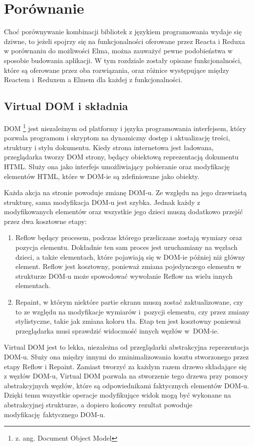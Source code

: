 \chapter{Porównanie} \label{chap:porownanie}
Choć porównywanie kombinacji bibliotek z językiem programowania wydaje się dziwne, to jeżeli spojrzy się na funkcjonalności oferowane przez Reacta i Reduxa w porównaniu do możliwości Elma, można zauważyć pewne podobieństwa w sposobie budowania aplikacji. W tym rozdziale zostały opisane funkcjonalności, które są oferowane przez oba rozwiązania, oraz różnice występujące między Reactem i~Reduxem a Elmem dla każdej z funkcjonalności.

\section{Virtual DOM i składnia}
DOM \footnote{z. ang. Document Object Model} jest niezależnym od platformy i języka programowania interfejsem, który pozwala programom i skryptom na dynamiczny dostęp i aktualizację treści, struktury i stylu dokumentu. Kiedy strona internetowa jest ładowana, przeglądarka tworzy DOM strony, będący obiektową reprezentacją dokumentu HTML. Służy ona jako interfejs umożliwiający pobieranie oraz modyfikację elementów HTML, które w DOM-ie są zdefiniowane jako obiekty.

Każda akcja na stronie powoduje zmianę DOM-u. Ze względu na jego drzewiastą strukturę, sama modyfikacja DOM-u jest szybka. Jednak każdy z modyfikowanych elementów oraz wszystkie jego dzieci muszą dodatkowo przejść przez dwa kosztowne etapy:
\begin{enumerate}
	\item Reflow będący procesem, podczas którego przeliczane zostają wymiary oraz pozycja elementu. Dokładnie ten sam proces jest uruchamiany na węzłach dzieci, a także elementach, które pojawiają się w DOM-ie później niż główny element. Reflow jest kosztowny, ponieważ zmiana pojedynczego elementu w strukturze DOM-u może spowodować wywołanie Reflow na wielu innych elementach.
	\item Repaint, w którym niektóre partie ekranu muszą zostać zaktualizowane, czy to ze względu na modyfikacje wymiarów i~pozycji elementu, czy przez zmiany stylistyczne, takie jak zmiana koloru tła. Etap ten jest kosztowny ponieważ przeglądarka musi sprawdzić widoczność innych węzłów w~DOM-ie.
\end{enumerate} 

Virtual DOM jest to lekka, niezależna od przeglądarki abstrakcyjna reprezentacja DOM-u. Służy ona między innymi do zminimalizowania kosztu stworzonego przez etapy Reflow i Repaint. Zamiast tworzyć za każdym razem drzewo składające się z węzłów DOM-u, Virtual DOM pozwala na stworzenie tego drzewa przy pomocy abstrakcyjnych węzłów, które są odpowiednikami faktycznych elementów DOM-u. Dzięki temu wszystkie operacje modyfikujące widok mogą być wykonane na abstrakcyjnej strukturze, a dopiero końcowy rezultat powoduje modyfikację faktycznego DOM-u.

